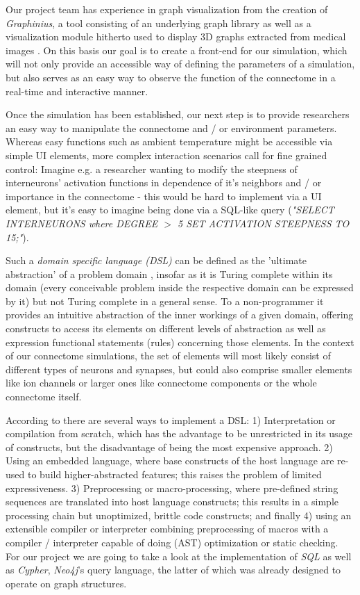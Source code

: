 \documentclass[a4paper,11pt]{article}
\begin{document}
Our project team has experience in graph visualization from the creation of \emph{Graphinius}, a tool consisting of an underlying graph library as well as a visualization module hitherto used to display 3D graphs extracted from medical images \citep{GraphExtractPaper}. On this basis our goal is to create a front-end for our simulation, which will not only provide an accessible way of defining the parameters of a simulation, but also serves as an easy way to observe the function of the connectome in a real-time and interactive manner.


Once the simulation has been established, our next step is to provide researchers an easy way to manipulate the connectome and / or environment parameters. Whereas easy functions such as ambient temperature might be accessible via simple UI elements, more complex interaction scenarios call for fine grained control: Imagine e.g. a researcher wanting to modify the steepness of interneurons' activation functions in dependence of it's neighbors and / or importance in the connectome - this would be hard to implement via a UI element, but it's easy to imagine being done via a SQL-like query (\textit{"SELECT INTERNEURONS where DEGREE $>$ 5 SET ACTIVATION STEEPNESS TO 15;"}).

Such a \textit{domain specific language (DSL)} can be defined as the 'ultimate abstraction' of a problem domain \citep{Hudak1998DSL}, insofar as it is Turing complete within its domain (every conceivable problem inside the respective domain can be expressed by it) but not Turing complete in a general sense. To a non-programmer it provides an intuitive abstraction of the inner workings of a given domain, offering constructs to access its elements on different levels of abstraction as well as expression functional statements (rules) concerning those elements. In the context of our connectome simulations, the set of elements will most likely consist of different types of neurons and synapses, but could also comprise smaller elements like ion channels or larger ones like connectome components or the whole connectome itself.

According to \citep{Deursen2000DSLImplementation} there are several ways to implement a DSL: 1) Interpretation or compilation from scratch, which has the advantage to be unrestricted in its usage of constructs, but the disadvantage of being the most expensive approach. 2) Using an embedded language, where base constructs of the host language are re-used to build higher-abstracted features; this raises the problem of limited expressiveness. 3) Preprocessing or macro-processing, where pre-defined string sequences are translated into host language constructs; this results in a simple processing chain but unoptimized, brittle code constructs; and finally 4) using an extensible compiler or interpreter combining preprocessing of macros with a compiler / interpreter capable of doing (AST) optimization or static checking. For our project we are going to take a look at the implementation of \emph{SQL} as well as \emph{Cypher}, \emph{Neo4j}’s query language, the latter of which was already designed to operate on graph structures.
\\[0,2cm]
\end{document}
